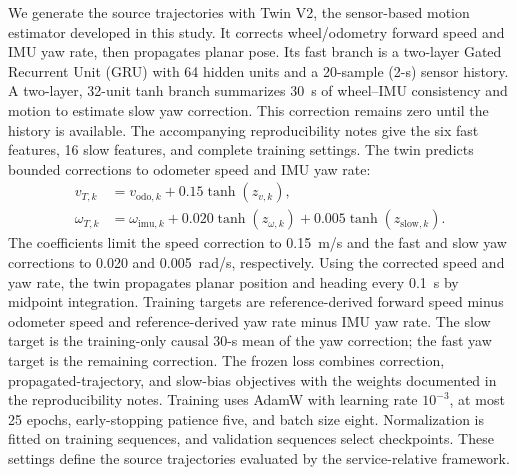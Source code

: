 \documentclass[journal]{IEEEtran}
\newcommand{\rev}[1]{#1}
\begin{document}
We generate the source trajectories with Twin V2, the sensor-based motion
estimator developed in this study. It corrects wheel/odometry forward
speed and IMU yaw rate, then propagates planar pose.
\rev{Its fast branch is a two-layer Gated Recurrent Unit (GRU) with 64
hidden units and a 20-sample (2-s) sensor history. A two-layer, 32-unit
tanh branch summarizes 30~s of wheel--IMU consistency and motion to
estimate slow yaw correction. This correction remains zero until the
history is available. The accompanying reproducibility notes give the
six fast features, 16 slow features, and complete training settings.}
The twin predicts bounded corrections to odometer speed and IMU yaw rate:
\begin{equation}
\begin{aligned}
v_{T,k} &= v_{\mathrm{odo},k}+0.15\tanh(z_{v,k}),\\
\omega_{T,k} &= \omega_{\mathrm{imu},k}
 +0.020\tanh(z_{\omega,k})
 +0.005\tanh(z_{\mathrm{slow},k}).
\end{aligned}
\label{eq:twin_bounded_corrections}
\end{equation}
The coefficients limit the speed correction to 0.15~m/s and the fast
and slow yaw corrections to 0.020 and 0.005~rad/s, respectively.
Using the corrected speed and yaw rate, the twin propagates planar
position and heading every 0.1~s by midpoint integration.
Training targets are reference-derived forward speed minus odometer speed
and reference-derived yaw rate minus IMU yaw rate. The slow target is the
training-only causal 30-s mean of the yaw correction; the fast yaw target
is the remaining correction. \rev{The frozen loss combines correction,
propagated-trajectory, and slow-bias objectives with the weights documented
in the reproducibility notes. Training uses AdamW with learning rate
$10^{-3}$, at most 25 epochs, early-stopping patience five, and batch size
eight.} Normalization is
fitted on training sequences, and validation sequences select checkpoints.
These settings define the source trajectories evaluated by the
service-relative framework.
\end{document}

